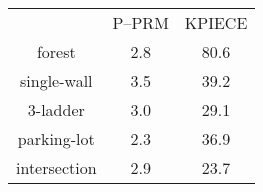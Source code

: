 \documentclass{article}
\begin{document}
\begin{tabular}{c c c}
&P--PRM&KPIECE\\
forest&2.8&80.6\\
single-wall&3.5&39.2\\
3-ladder&3.0&29.1\\
parking-lot&2.3&36.9\\
intersection&2.9&23.7\\
\end{tabular}
\end{document}
